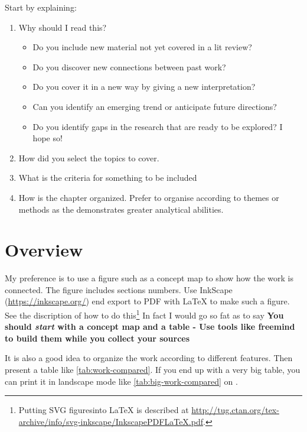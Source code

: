 Start by explaining:
\begin{enumerate}

    \item Why should I read this?
    \begin{itemize}
        \item Do you include new material not yet covered in a lit review?
        \item Do you discover new connections between past work?
        \item Do you cover it in a new way by giving a new interpretation?
        \item Can you identify an emerging trend or anticipate future directions?
        \item Do you identify gaps in the research that are ready to be explored? I hope so!
    \end{itemize}
    \item How did you select the topics to cover.
    \item What is the criteria for something to be included
    \item How is the chapter organized. Prefer to organise according to themes or methods as the demonstrates greater analytical abilities.
\end{enumerate}



\section{Overview}

My preference is to use a figure such as a concept map to show how the work is connected. The figure includes sections numbers. Use InkScape (\url{https://inkscape.org/}) end export to PDF with LaTeX to make such a figure.
 See the discription of how to do this\footnote{Putting SVG figuresinto \LaTeX{} is described at \url{http://tug.ctan.org/tex-archive/info/svg-inkscape/InkscapePDFLaTeX.pdf}.  }
 In fact I would go so fat as to say \textbf{You should \textit{start} with a concept map and a table - Use tools like freemind to build them while you collect your sources }


It is also a good idea to organize the work according to different features.
Then present a table like \autoref{tab:work-compared}.   If  you end up with a very big table, you can print it in landscape mode like \autoref{tab:big-work-compared} on .

